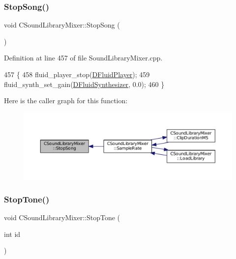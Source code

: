 \subsubsection{\texorpdfstring{Stop\+Song()}{StopSong()}}
{\footnotesize\ttfamily void C\+Sound\+Library\+Mixer\+::\+Stop\+Song (\begin{DoxyParamCaption}{ }\end{DoxyParamCaption})}



Definition at line 457 of file Sound\+Library\+Mixer.\+cpp.


\begin{DoxyCode}
457                                  \{
458     fluid\_player\_stop(\hyperlink{classCSoundLibraryMixer_a6773ddf83ef86bc27598f6c5cee61d9c}{DFluidPlayer});
459     fluid\_synth\_set\_gain(\hyperlink{classCSoundLibraryMixer_a6c1663c381dbf2aa18c82a23141f409c}{DFluidSynthesizer}, 0.0);
460 \}
\end{DoxyCode}
Here is the caller graph for this function\+:\nopagebreak
\begin{figure}[H]
\begin{center}
\leavevmode
\includegraphics[width=350pt]{classCSoundLibraryMixer_a13fdebfbc5fdee60067c38a3c60dd2a9_icgraph}
\end{center}
\end{figure}
\hypertarget{classCSoundLibraryMixer_ab57bc3217de14130ed95c48223351ce3}{}\label{classCSoundLibraryMixer_ab57bc3217de14130ed95c48223351ce3} 
\subsubsection{\texorpdfstring{Stop\+Tone()}{StopTone()}}
{\footnotesize\ttfamily void C\+Sound\+Library\+Mixer\+::\+Stop\+Tone (\begin{DoxyParamCaption}\item[{int}]{id }\end{DoxyParamCaption})}



